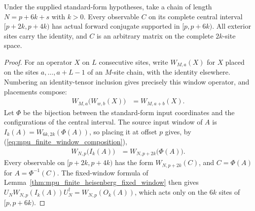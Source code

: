 \begin{lemma}
    \label{lem:mpu_finite_window_operator_support}
    \leanok
    Under the supplied standard-form hypotheses, take a chain of length
    $N=p+6k+s$ with $k>0$. Every observable $C$ on its complete central
    interval $[p+2k,p+4k)$ has actual forward conjugate supported in
    $[p,p+6k)$. All exterior sites carry the identity, and $C$ is an
    arbitrary matrix on the complete $2k$-site space.
\end{lemma}
\begin{proof}\leanok
    For an operator $X$ on $L$ consecutive sites, write $W_{M,a}(X)$
    for $X$ placed on the sites $a,\dots,a+L-1$ of an $M$-site chain,
    with the identity elsewhere. Numbering an identity-tensor inclusion
    gives precisely this window operator, and placements compose:
    \begin{align}
        W_{M,a}\bigl(W_{w,b}(X)\bigr) & =W_{M,a+b}(X).
        \label{eq:mpu_finite_window_composition}
    \end{align}
    Let $\Phi$ be the bijection between the standard-form input
    coordinates and the configurations of the central interval. The
    source input window of $A$ is $I_k(A)=W_{6k,2k}(\Phi(A))$, so
    placing it at offset $p$ gives, by
    (\ref{eq:mpu_finite_window_composition}),
    \begin{align}
        W_{N,p}\bigl(I_k(A)\bigr) & =W_{N,p+2k}\bigl(\Phi(A)\bigr).
    \end{align}
    Every observable on $[p+2k,p+4k)$ has the form $W_{N,p+2k}(C)$, and
    $C=\Phi(A)$ for $A=\Phi^{-1}(C)$. The fixed-window formula of
    Lemma~\ref{thm:mpu_finite_heisenberg_fixed_window} then gives
    $U_N W_{N,p}(I_k(A))U_N^\dagger=W_{N,p}(O_k(A))$, which acts only on
    the $6k$ sites of $[p,p+6k)$.
\end{proof}


